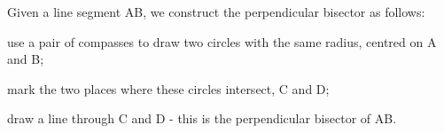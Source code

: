 Given a line segment AB, we construct the perpendicular bisector as follows:
\par
use a pair of compasses to draw two circles with the same radius, centred
on A and B;
\par
mark the two places where these circles intersect, C and D;
\par
draw a line through C and D - this is the perpendicular bisector of AB.
